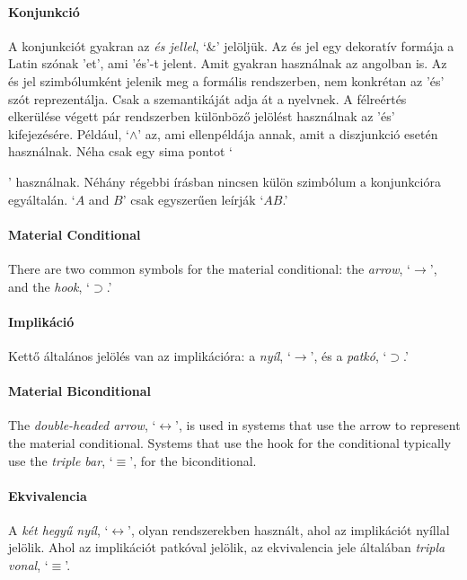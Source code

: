 \paragraph{Konjunkció}
A konjunkciót gyakran az \emph{és jellel}, `{\&}' jelöljük. Az és jel egy dekoratív formája a Latin szónak ’et’, ami ’és’-t jelent. Amit gyakran használnak az angolban is. Az és jel szimbólumként jelenik meg a formális rendszerben, nem konkrétan az 'és' szót reprezentálja. Csak a szemantikáját adja át a nyelvnek. A félreértés elkerülése végett pár rendszerben különböző jelölést használnak az 'és' kifejezésére. 
Például, `$\wedge$' az, ami ellenpéldája annak, amit a diszjunkció esetén használnak. Néha csak egy sima pontot `\begin{scriptsize}\textbullet\end{scriptsize}' használnak. Néhány régebbi írásban nincsen külön szimbólum a konjunkcióra egyáltalán. `$A$ and $B$' csak egyszerűen leírják `$AB$.'



\paragraph{Material Conditional} There are two common symbols for the material conditional: the \emph{arrow}, `$\rightarrow$', and the \emph{hook}, `$\supset$.'

\paragraph{Implikáció} Kettő általános jelölés van az implikációra: a \emph{nyíl}, `$\rightarrow$', és a \emph{patkó}, `$\supset$.'

\paragraph{Material Biconditional} The \emph{double-headed arrow}, `$\leftrightarrow$', is used in systems that use the arrow to represent the material conditional. Systems that use the hook for the conditional typically use the \emph{triple bar}, `$\equiv$', for the biconditional.

\paragraph{Ekvivalencia} A \emph{két hegyű nyíl}, `$\leftrightarrow$', olyan rendszerekben használt, ahol az implikációt nyíllal jelölik. Ahol az implikációt patkóval jelölik, az ekvivalencia jele általában \emph{tripla vonal}, `$\equiv$'.

